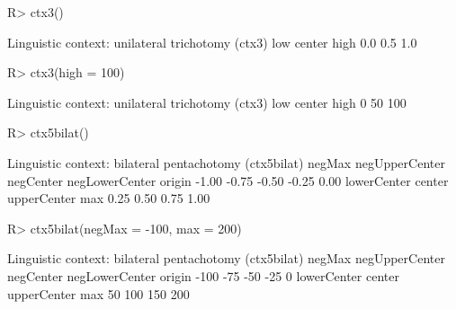 \begin{Schunk}
% --begin: "ctx"
\begin{Sinput}
R> ctx3()
\end{Sinput}
\begin{Soutput}
Linguistic context: unilateral trichotomy (ctx3)
   low center   high 
   0.0    0.5    1.0 
\end{Soutput}
\begin{Sinput}
R> ctx3(high = 100)
\end{Sinput}
\begin{Soutput}
Linguistic context: unilateral trichotomy (ctx3)
   low center   high 
     0     50    100 
\end{Soutput}
\begin{Sinput}
R> ctx5bilat()
\end{Sinput}
\begin{Soutput}
Linguistic context: bilateral pentachotomy (ctx5bilat)
        negMax negUpperCenter      negCenter negLowerCenter         origin 
         -1.00          -0.75          -0.50          -0.25           0.00 
   lowerCenter         center    upperCenter            max 
          0.25           0.50           0.75           1.00 
\end{Soutput}
\begin{Sinput}
R> ctx5bilat(negMax = -100, max = 200)
\end{Sinput}
\begin{Soutput}
Linguistic context: bilateral pentachotomy (ctx5bilat)
        negMax negUpperCenter      negCenter negLowerCenter         origin 
          -100            -75            -50            -25              0 
   lowerCenter         center    upperCenter            max 
            50            100            150            200 
\end{Soutput}
%
% --end: "ctx"
\end{Schunk}
